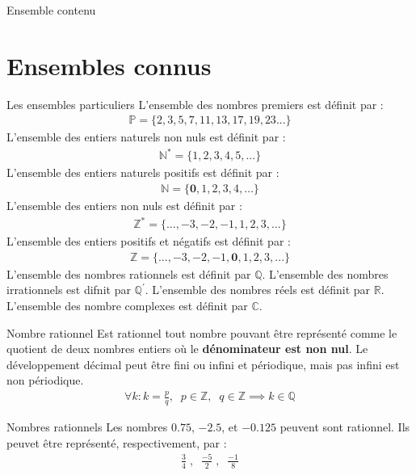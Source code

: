 \documentclass[8pt]{report}
\begin{document}
\begin{multicols*}{2}
\begin{Remarque}{Ensemble contenu}{}
\end{Remarque}


\section{Ensembles connus}
\begin{Syntaxe}{Les ensembles particuliers}{}
    L'ensemble des nombres premiers est définit par : 
    \begin{align}
      \mathbb{P} = \{2, 3, 5, 7, 11, 13, 17, 19, 23...\}
    \end{align}
    L'ensemble des entiers naturels non nuls est définit par :
    \begin{align}
      \mathbb{N}^* = \{ 1, 2, 3, 4, 5, ... \}
    \end{align}
    L'ensemble des entiers naturels positifs est définit par :
    \begin{align}
      \mathbb{N} = \{ \textbf{0}, 1, 2, 3, 4, \dots \}
    \end{align}
    L'ensemble des entiers non nuls est définit par :
    \begin{align}
      \mathbb{Z}^* = \{..., -3, -2, -1, 1, 2, 3, ...\} 
    \end{align}
    L'ensemble des entiers positifs et négatifs est définit par : 
    \begin{align}
      \mathbb{Z} = \{..., -3, -2, -1, \textbf{0}, 1, 2, 3, ... \}
    \end{align}
    L'ensemble des nombres rationnels est définit par $\mathbb{Q}$.
    L'ensemble des nombres irrationnels est difnit par $\mathbb{Q}^{'}$.
    L'ensemble des nombres réels est définit par $\mathbb{R}$.
    L'ensemble des nombre complexes est définit par  $\mathbb{C}$. 
\end{Syntaxe}

\begin{Definition}{Nombre rationnel}{}
  Est rationnel tout nombre pouvant être représenté comme le quotient de deux
  nombres entiers où le \textbf{dénominateur est non nul}. Le développement décimal 
  peut être fini ou infini et périodique, mais pas infini est non périodique. 
  \begin{align}
    \forall k : k = \frac{p}{q}, \; \; p \in \mathbb{Z}, \; \; q \in \mathbb{Z}  \implies k \in \mathbb{Q}
  \end{align}
\end{Definition}
\begin{EExample}{Nombres rationnels}{}
  Les nombres $0.75$, $-2.5$, et $-0.125$ peuvent sont rationnel. Ils peuvet être représenté,
  respectivement, par : 
  \begin{align*}
    \frac{3}{4}\;, \; \; \frac{-5}{2}\;, \;\; \frac{-1}{8}
  \end{align*}
\end{EExample}



\end{multicols*}
\end{document}
